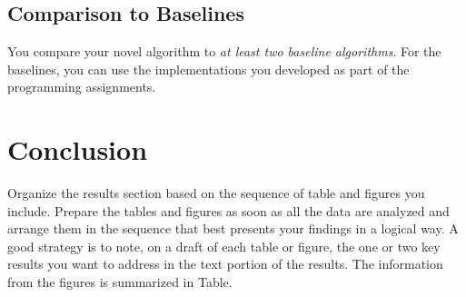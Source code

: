 \documentclass[10pt,conference,compsocconf]{IEEEtran}
\begin{document}
    \subsection{Comparison to Baselines}

    You compare your novel algorithm to \emph{at least two baseline
    algorithms}. For the baselines, you can use the implementations you
    developed as part of the programming assignments.


    \section{Conclusion}

    Organize the results section based on the sequence of table and
    figures you include. Prepare the tables and figures as soon as all
    the data are analyzed and arrange them in the sequence that best
    presents your findings in a logical way. A good strategy is to note,
    on a draft of each table or figure, the one or two key results you
    want to address in the text portion of the results.
    The information from the figures is
    summarized in Table.\cite{anderson04}




    
    
\end{document}
